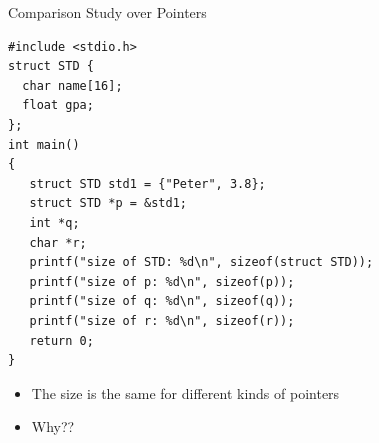 \begin{frame}[fragile]{Comparison Study over Pointers}
\vspace{-0.1in}
\begin{lstlisting}[xleftmargin=0.05\linewidth, linewidth=0.95\linewidth]
#include <stdio.h>
struct STD {
  char name[16];
  float gpa;
};
int main()
{
   struct STD std1 = {"Peter", 3.8};
   struct STD *p = &std1;
   int *q;
   char *r;
   printf("size of STD: %d\n", sizeof(struct STD));
   printf("size of p: %d\n", sizeof(p));
   printf("size of q: %d\n", sizeof(q));
   printf("size of r: %d\n", sizeof(r));
   return 0;
}
\end{lstlisting}
\vspace{-0.2in}
\begin{itemize}
	\item {The size is the same for different kinds of pointers}
	\item {Why??}
\end{itemize}
\end{frame}